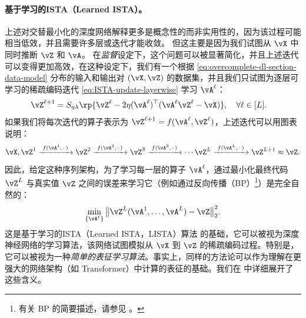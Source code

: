 \documentclass[../../book-main_zh.tex]{subfiles}
\begin{document}
    \paragraph{基于学习的ISTA（Learned ISTA）。}
    上述对交替最小化的深度网络解释更多是概念性的而非实用性的，因为该过程可能相当低效，并且需要许多层或迭代才能收敛。
    但这主要是因为我们试图从 \(\vX\) 中同时推断 \(\vZ\) 和 \(\vA\)。
    在\textit{监督}设定下，这个问题可以被显著简化，并且上述迭代可以变得更加高效，在这种设定下，我们有一个根据
    \eqref{eq:overcomplete-dl-section-data-model} 分布的输入和输出对 \((\vX,
    \vZ)\) 的数据集，并且我们只试图为逐层可学习的稀疏编码迭代 \eqref{eq:ISTA-update-layerwise}
    学习 \(\vA^\ell\)：
    \begin{align}
        & \vZ^{\ell + 1} = S_{\eta\lambda}\rp{\vZ^{\ell} -
        2\eta(\vA^{\ell})^{\top}(\vA^\ell\vZ^{\ell} - \vX)}, \quad
        \forall \ell \in [L].
    \end{align}
    如果我们将每次迭代的算子表示为 $\vZ^{\ell + 1} =
    f(\vA^\ell, \vZ^\ell)$，上述迭代可以用图表说明：
    \begin{equation*}
        \vX, \vZ^1 \xrightarrow{\hspace{1mm} f(\vA^1,\,\cdot\,)
        \hspace{1mm}}  \vZ^2 \xrightarrow{\hspace{1mm}
        f(\vA^2,\,\cdot\,) \hspace{1mm}}  \vZ^3
        \xrightarrow{\hspace{1mm} f(\vA^3,\,\cdot\,) \hspace{1mm}}
        \cdots \vZ^{L}  \xrightarrow{\hspace{1mm}
        f(\vA^{L},\,\cdot\,) \hspace{1mm}} \vZ^{L + 1} \approx \vZ.
        \label{eqn:deep-sparse-encoding}
    \end{equation*}
    因此，给定这种序列架构，为了学习每一层的算子 \(\vA^\ell\)，通过最小化最终代码 $\vZ^L$ 与真实值 $\vZ$
    之间的误差来学习它（例如通过反向传播（BP）\footnote{有关 BP 的简要描述，请参见
    。}）是完全自然的：
    \begin{equation}\label{eq:lista-training}
        \min_{\{\vA^\ell\}} \big\|\vZ^L(\vA^1, \ldots, \vA^{L}) - \vZ\big\|_2^2.
    \end{equation}
    这是基于学习的ISTA（Learned ISTA，LISTA）算法 \cite{gregor2010learning}
    的基础，它可以被视为深度神经网络的学习算法，该网络试图模拟从 $\vX$ 到 $\vZ$
    的稀疏编码过程。特别是，它可以被视为一种\textit{简单的表征学习算法}。事实上，同样的方法论可以作为理解在更强大的网络架构（如
    Transformer）中计算的表征的基础。我们在  中详细展开了这些含义。
\end{document}
